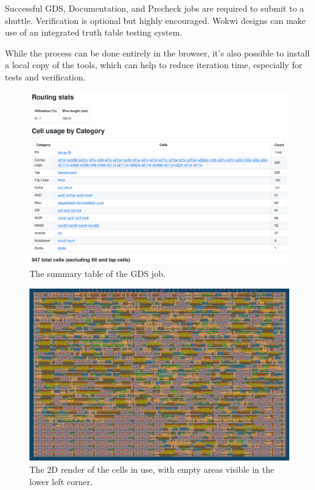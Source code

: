Successful GDS, Documentation, and Precheck jobs are required to submit to a shuttle.
Verification is optional but highly encouraged. Wokwi designs can make use of an integrated truth table testing system\cite{automatedtesting}.

While the process can be done entirely in the browser, it’s also possible to install a local copy of the tools, which can help to reduce iteration time, especially for tests and verification.

\begin{figure}[htp]
\centering
\includegraphics[width=\columnwidth]{./Figs/gh action cell stats.png}
\caption{The summary table of the GDS job.}
\label{fig:summary_table_GDS_job}
\end{figure}

\begin{figure}[htp]
\centering
\includegraphics[width=\columnwidth]{./Figs/gh action gds layout.png}
\caption{The 2D render of the cells in use, with empty areas visible in the lower left corner.}
\label{fig:render_cells_in_use}
\end{figure}

